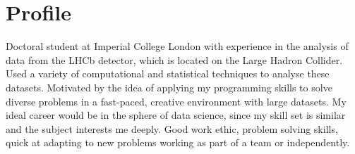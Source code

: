 
\section{Profile}
\cvline{}{}
{
  Doctoral student at Imperial College London with experience in the analysis of data
  from the LHCb detector, which is located on the Large Hadron Collider.
  Used a variety of computational and statistical techniques to analyse these datasets.
  Motivated by the idea of applying my programming skills to
  solve diverse problems in a fast-paced, creative environment with large datasets.
  My ideal career would be in the sphere of data science, since my skill set is similar and
  the subject interests me deeply.
  Good work ethic, problem solving skills, quick at adapting to new problems working as part of a
  team or independently.

}

















